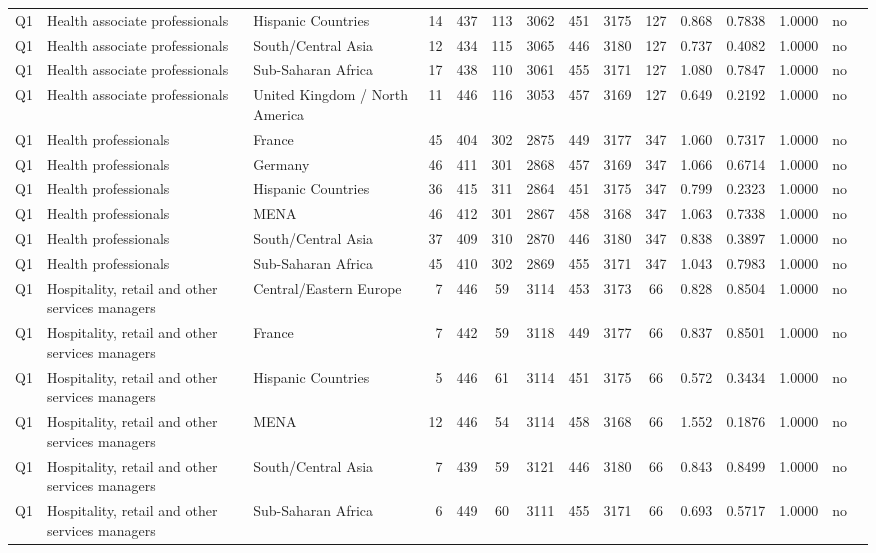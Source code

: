 \begin{longtable}{lllrcccccccccll}
Q1 & Health associate professionals & Hispanic Countries & 14 & 437 & 113 & 3062 & 451 & 3175 & 127 & 0.868 & 0.7838 & 1.0000 & no \\
Q1 & Health associate professionals & South/Central Asia & 12 & 434 & 115 & 3065 & 446 & 3180 & 127 & 0.737 & 0.4082 & 1.0000 & no \\
Q1 & Health associate professionals & Sub-Saharan Africa & 17 & 438 & 110 & 3061 & 455 & 3171 & 127 & 1.080 & 0.7847 & 1.0000 & no \\
Q1 & Health associate professionals & United Kingdom / North America & 11 & 446 & 116 & 3053 & 457 & 3169 & 127 & 0.649 & 0.2192 & 1.0000 & no \\
Q1 & Health professionals & France & 45 & 404 & 302 & 2875 & 449 & 3177 & 347 & 1.060 & 0.7317 & 1.0000 & no \\
Q1 & Health professionals & Germany & 46 & 411 & 301 & 2868 & 457 & 3169 & 347 & 1.066 & 0.6714 & 1.0000 & no \\
Q1 & Health professionals & Hispanic Countries & 36 & 415 & 311 & 2864 & 451 & 3175 & 347 & 0.799 & 0.2323 & 1.0000 & no \\
Q1 & Health professionals & MENA & 46 & 412 & 301 & 2867 & 458 & 3168 & 347 & 1.063 & 0.7338 & 1.0000 & no \\
Q1 & Health professionals & South/Central Asia & 37 & 409 & 310 & 2870 & 446 & 3180 & 347 & 0.838 & 0.3897 & 1.0000 & no \\
Q1 & Health professionals & Sub-Saharan Africa & 45 & 410 & 302 & 2869 & 455 & 3171 & 347 & 1.043 & 0.7983 & 1.0000 & no \\
Q1 & Hospitality, retail and other services managers & Central/Eastern Europe & 7 & 446 & 59 & 3114 & 453 & 3173 & 66 & 0.828 & 0.8504 & 1.0000 & no \\
Q1 & Hospitality, retail and other services managers & France & 7 & 442 & 59 & 3118 & 449 & 3177 & 66 & 0.837 & 0.8501 & 1.0000 & no \\
Q1 & Hospitality, retail and other services managers & Hispanic Countries & 5 & 446 & 61 & 3114 & 451 & 3175 & 66 & 0.572 & 0.3434 & 1.0000 & no \\
Q1 & Hospitality, retail and other services managers & MENA & 12 & 446 & 54 & 3114 & 458 & 3168 & 66 & 1.552 & 0.1876 & 1.0000 & no \\
Q1 & Hospitality, retail and other services managers & South/Central Asia & 7 & 439 & 59 & 3121 & 446 & 3180 & 66 & 0.843 & 0.8499 & 1.0000 & no \\
Q1 & Hospitality, retail and other services managers & Sub-Saharan Africa & 6 & 449 & 60 & 3111 & 455 & 3171 & 66 & 0.693 & 0.5717 & 1.0000 & no \\

\end{longtable}
